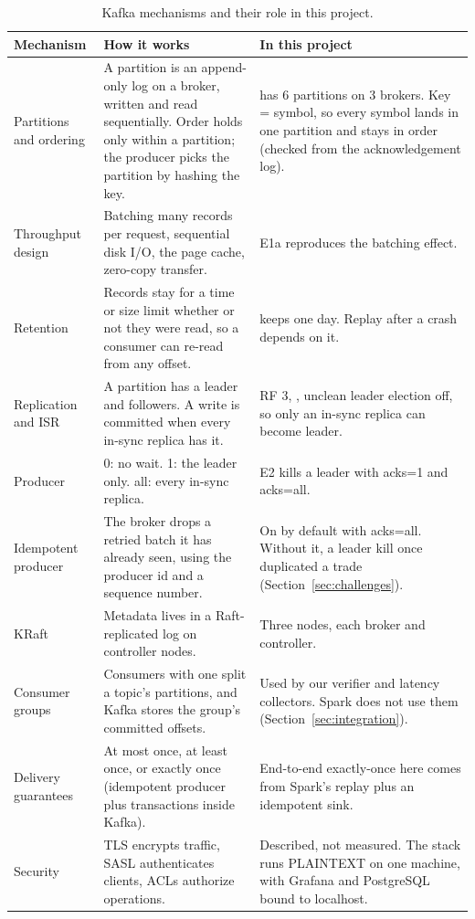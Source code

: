 \begin{table}[H]
\centering\small
\caption{Kafka mechanisms and their role in this project.}
\label{tab:kafka}
\begin{tabularx}{\textwidth}{@{}>{\raggedright\arraybackslash}p{3.1cm}YY@{}}
\toprule
Mechanism & How it works & In this project \\
\midrule
Partitions and ordering & A partition is an append-only log on a broker, written and read sequentially. Order holds only within a partition; the producer picks the partition by hashing the key. &  has 6 partitions on 3 brokers. Key = symbol, so every symbol lands in one partition and stays in order (checked from the acknowledgement log). \\
Throughput design~\cite{kreps2011} & Batching many records per request, sequential disk I/O, the page cache, zero-copy transfer. & E1a reproduces the batching effect. \\
Retention & Records stay for a time or size limit whether or not they were read, so a consumer can re-read from any offset. &  keeps one day. Replay after a crash depends on it. \\
Replication and ISR~\cite{wang2015} & A partition has a leader and followers. A write is committed when every in-sync replica has it. & RF 3, , unclean leader election off, so only an in-sync replica can become leader. \\
Producer  & 0: no wait. 1: the leader only. all: every in-sync replica. & E2 kills a leader with acks=1 and acks=all. \\
Idempotent producer & The broker drops a retried batch it has already seen, using the producer id and a sequence number. & On by default with acks=all. Without it, a leader kill once duplicated a trade (Section~\ref{sec:challenges}). \\
KRaft & Metadata lives in a Raft-replicated log on controller nodes. & Three nodes, each broker and controller. \\
Consumer groups & Consumers with one  split a topic's partitions, and Kafka stores the group's committed offsets. & Used by our verifier and latency collectors. Spark does not use them (Section~\ref{sec:integration}). \\
Delivery guarantees & At most once, at least once, or exactly once (idempotent producer plus transactions inside Kafka). & End-to-end exactly-once here comes from Spark's replay plus an idempotent sink. \\
Security & TLS encrypts traffic, SASL authenticates clients, ACLs authorize operations. & Described, not measured. The stack runs PLAINTEXT on one machine, with Grafana and PostgreSQL bound to localhost. \\
\bottomrule
\end{tabularx}
\end{table}

